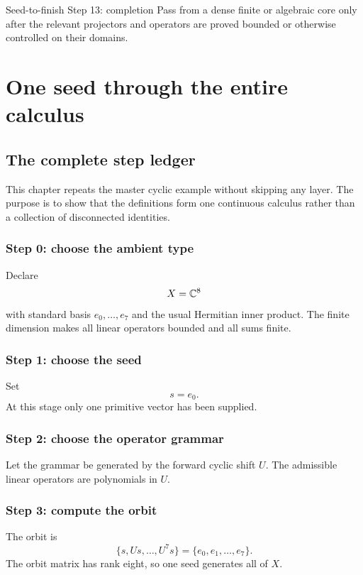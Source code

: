 \begin{stepbox}{Seed-to-finish Step 13: completion}
Pass from a dense finite or algebraic core only after the relevant projectors and operators are proved bounded or otherwise controlled on their domains.
\end{stepbox}

\chapter{One seed through the entire calculus}\label{ch:master-example}

\section{The complete step ledger}
This chapter repeats the master cyclic example without skipping any layer.  The purpose is to show that the definitions form one continuous calculus rather than a collection of disconnected identities.


\subsection{Step 0: choose the ambient type}
Declare
\[
X=\mathbb C^8
\]
with standard basis $e_0,\ldots,e_7$ and the usual Hermitian inner product.  The finite dimension makes all linear operators bounded and all sums finite.

\subsection{Step 1: choose the seed}
Set
\[
s=e_0.
\]
At this stage only one primitive vector has been supplied.

\subsection{Step 2: choose the operator grammar}
Let the grammar be generated by the forward cyclic shift $U$.  The admissible linear operators are polynomials in $U$.

\subsection{Step 3: compute the orbit}
The orbit is
\[
\{s,Us,\ldots,U^7s\}
=
\{e_0,e_1,\ldots,e_7\}.
\]
The orbit matrix has rank eight, so one seed generates all of $X$.


